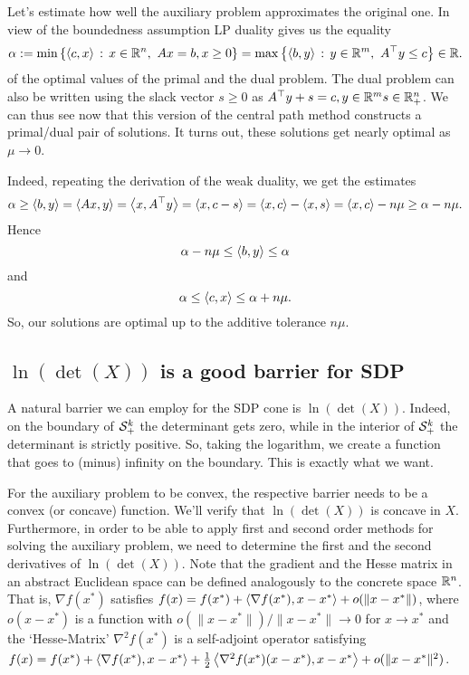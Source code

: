 	Let's estimate how well the auxiliary problem approximates the original one. In view of the boundedness assumption LP duality gives us the equality
	\[
		\alpha := \min \left\{  \left\langle c , x \right\rangle  \,:\, x \in \mathbb{R}^n, \ A x = b, x \ge 0 \right\} = \max \left\{  \left\langle b , y \right\rangle \,:\,  y \in \mathbb{R}^m, \ A^\top y \le c \right\} \in \mathbb{R}.
	\]
	of the optimal values of the primal and the dual problem. 
	The dual problem can also be written using the slack vector $s \ge 0$ as $A^\top y + s = c, y \in \mathbb{R}^m s \in \mathbb{R}_+^n$. We can thus see now that this version of the central path method constructs a primal/dual pair of solutions. It turns out, these solutions get nearly optimal as $\mu \to 0$. 
	
	Indeed, repeating the derivation of the weak duality, we get the estimates
	\[
		\alpha \ge \left\langle b , y \right\rangle = \left\langle A x , y \right\rangle= \left\langle x , A^\top y \right\rangle = \left\langle x , c-s \right\rangle = \left\langle x , c \right\rangle - \left\langle x , s \right\rangle = \left\langle x , c \right\rangle - n \mu \ge \alpha - n \mu.
	\]
	Hence 
	\[
		\alpha - n \mu \le \left\langle b , y \right\rangle \le \alpha 
	\]
	and 
	\[
		\alpha \le \left\langle c , x \right\rangle \le \alpha + n \mu.
	\]
	So, our solutions are optimal up to the additive tolerance $n \mu$. 

\subsection{$\ln(\det(X))$ is a good barrier for SDP}

A natural barrier we can employ for the SDP cone is $\ln(\det(X))$. Indeed, on the boundary of $\mathcal{S}_+^k$ the determinant gets zero, while in the interior of $\mathcal{S}_+^k$ the determinant is strictly positive. So, taking the logarithm, we create a function that goes to (minus) infinity on the boundary. This is exactly what we want. 

For the auxiliary problem to be convex, the respective barrier needs to be a convex (or concave) function. We'll verify that $\ln(\det(X))$ is concave in $X$. Furthermore, in order to be able to apply first and second order methods for solving the auxiliary problem, we need to determine the first and the second derivatives of $\ln(\det(X))$. Note that the gradient and the Hesse matrix in an abstract Euclidean space can be defined analogously to the concrete space $\mathbb{R}^n$. That is, $\nabla f(x^\ast)$ satisfies $f(x) = f(x^\ast) + \left\langle \nabla f(x^\ast) , x-x^\ast \right\rangle + o(\|x-x^\ast\|)$, where $o(x-x^\ast)$ is a function with $o(\|x-x^\ast\|) / \|x-x^\ast\| \to 0$ for $x \to x^\ast$ and the `Hesse-Matrix' $\nabla^2 f(x^\ast)$ is a self-adjoint operator satisfying $f(x) = f(x^\ast) + \left\langle \nabla f(x^\ast) , x-x^\ast \right\rangle + \frac{1}{2} \left\langle \nabla^2 f(x^\ast) (x-x^\ast) , x-x^\ast \right\rangle + o(\|x-x^\ast\|^2)$. 


